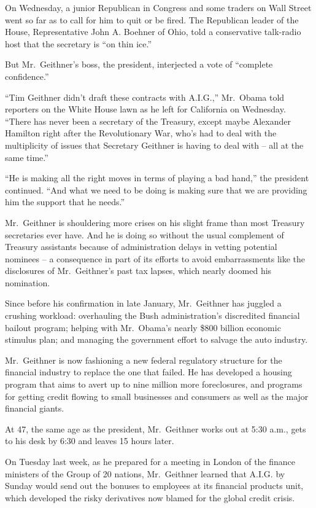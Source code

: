 \documentclass[12pt,a4paper,onecolumn]{article}
\begin{document}
\begin{CJK*}{GBK}{song}
On Wednesday, a junior Republican in Congress and some traders on Wall Street went so far as to call
for him to quit or be fired. The Republican leader of the House, Representative John A. Boehner of
Ohio, told a conservative talk-radio host that the secretary is ``on thin ice.''

But Mr.~Geithner's boss, the president, interjected a vote of ``complete confidence.''

``Tim Geithner didn't draft these contracts with A.I.G.,'' Mr.~Obama told reporters on the White
House lawn as he left for California on Wednesday. ``There has never been a secretary of the
Treasury, except maybe Alexander Hamilton right after the Revolutionary War, who's had to deal with
the multiplicity of issues that Secretary Geithner is having to deal with -- all at the same time.''

``He is making all the right moves in terms of playing a bad hand,'' the president continued. ``And
what we need to be doing is making sure that we are providing him the support that he needs.''

Mr.~Geithner is shouldering more crises on his slight frame than most Treasury secretaries ever
have. And he is doing so without the usual complement of Treasury assistants because of
administration delays in vetting potential nominees -- a consequence in part of its efforts to avoid
embarrassments like the disclosures of Mr.~Geithner's past tax lapses, which nearly doomed his
nomination.

Since before his confirmation in late January, Mr.~Geithner has juggled a crushing workload:
overhauling the Bush administration's discredited financial bailout program; helping with
Mr.~Obama's nearly \$800 billion economic stimulus plan; and managing the government effort to
salvage the auto industry.

Mr.~Geithner is now fashioning a new federal regulatory structure for the financial industry to
replace the one that failed. He has developed a housing program that aims to avert up to nine
million more foreclosures, and programs for getting credit flowing to small businesses and consumers
as well as the major financial giants.

At 47, the same age as the president, Mr.~Geithner works out at 5:30 a.m., gets to his desk by 6:30
and leaves 15 hours later.

On Tuesday last week, as he prepared for a meeting in London of the finance ministers of the Group
of 20 nations, Mr.~Geithner learned that A.I.G. by Sunday would send out the bonuses to employees at
its financial products unit, which developed the risky derivatives now blamed for the global credit
crisis.


\end{CJK*}
\end{document}
